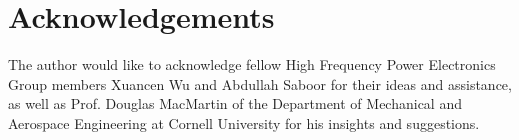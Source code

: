 \documentclass[conference, twocolumn, letterpaper]{IEEEtran}
\begin{document}
\section{Acknowledgements}
\label{sec:ack}

The author would like to acknowledge fellow High Frequency Power Electronics Group members Xuancen Wu and Abdullah Saboor for their ideas and assistance, as well as Prof. Douglas MacMartin of the Department of Mechanical and Aerospace Engineering at Cornell University for his insights and suggestions.

\footnotesize
\begin{spacing}{1.0}


\end{spacing}
\end{document}
